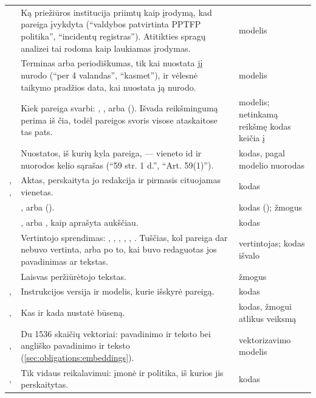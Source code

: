 \begin{xltabular}{\textwidth}{@{}L{31mm}YL{27mm}@{}}
 & Ką priežiūros institucija priimtų kaip įrodymą, kad pareiga įvykdyta (\enquote{valdybos patvirtinta PPTFP politika}, \enquote{incidentų registras}). Atitikties spragų analizei tai rodoma kaip laukiamas įrodymas. & modelis \\
 & Terminas arba periodiškumas, tik kai nuostata jį nurodo (\enquote{per 4 valandas}, \enquote{kasmet}), ir vėlesnė taikymo pradžios data, kai nuostata ją nurodo. & modelis \\
 & Kiek pareiga svarbi: , ,  arba  (). Išvada reikšmingumą perima iš čia, todėl pareigos svoris visose ataskaitose tas pats. & modelis; netinkamą reikšmę kodas keičia į  \\
 & Nuostatos, iš kurių kyla pareiga, --- vieneto id ir nuorodos kelio sąrašas (\enquote{59 str. 1 d.}, \enquote{Art. 59(1)}). & kodas, pagal modelio nuorodas \\
, ,  & Aktas, perskaityta jo redakcija ir pirmasis cituojamas vienetas. & kodas \\
 & ,  arba  (). & kodas (); žmogus \\
 & ,  arba , kaip aprašyta aukščiau. & kodas \\
 & Vertintojo sprendimas: , , , , , . Tuščias, kol pareiga dar nebuvo vertinta, arba po to, kai buvo redaguotas jos pavadinimas ar tekstas. & vertintojas; kodas išvalo \\
 & Laisvas peržiūrėtojo tekstas. & žmogus \\
,  & Instrukcijos versija ir modelis, kurie išskyrė pareigą. & kodas \\
,  & Kas ir kada nustatė būseną. & kodas, žmogui atlikus veiksmą \\
,  & Du 1536 skaičių vektoriai: pavadinimo ir teksto bei angliško pavadinimo ir teksto (\cref{sec:obligations:embeddings}). & vektorizavimo modelis \\
,  & Tik vidaus reikalavimui: įmonė ir politika, iš kurios jis perskaitytas. & kodas \\
\end{xltabular}

